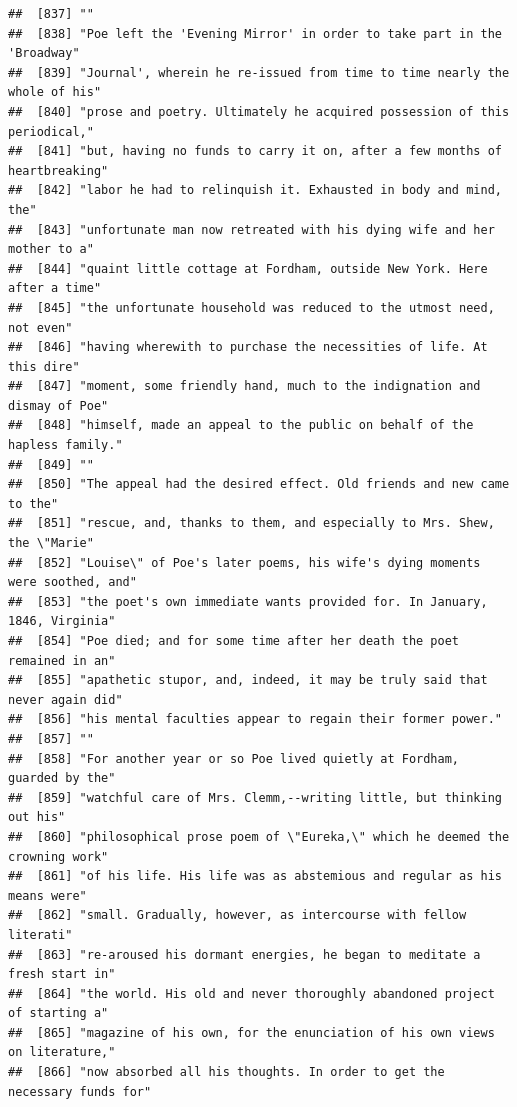 \documentclass{article}\usepackage[]{graphicx}\usepackage[]{color}
\makeatletter
\newenvironment{kframe}{%
 \def\at@end@of@kframe{}%
 \ifinner\ifhmode%
  \def\at@end@of@kframe{\end{minipage}}%
  \begin{minipage}{\columnwidth}%
 \fi\fi%
 \def\FrameCommand##1{\hskip\@totalleftmargin \hskip-\fboxsep
 \colorbox{shadecolor}{##1}\hskip-\fboxsep
     \hskip-\linewidth \hskip-\@totalleftmargin \hskip\columnwidth}%
 \MakeFramed {\advance\hsize-\width
   \@totalleftmargin\z@ \linewidth\hsize
   \@setminipage}}%
 {\par\unskip\endMakeFramed%
 \at@end@of@kframe}
\newenvironment{knitrout}{}{} %
\makeatother
\begin{document}
\begin{knitrout}
\begin{kframe}
\begin{verbatim}
##  [837] ""                                                                            
##  [838] "Poe left the 'Evening Mirror' in order to take part in the 'Broadway"        
##  [839] "Journal', wherein he re-issued from time to time nearly the whole of his"    
##  [840] "prose and poetry. Ultimately he acquired possession of this periodical,"     
##  [841] "but, having no funds to carry it on, after a few months of heartbreaking"    
##  [842] "labor he had to relinquish it. Exhausted in body and mind, the"              
##  [843] "unfortunate man now retreated with his dying wife and her mother to a"       
##  [844] "quaint little cottage at Fordham, outside New York. Here after a time"       
##  [845] "the unfortunate household was reduced to the utmost need, not even"          
##  [846] "having wherewith to purchase the necessities of life. At this dire"          
##  [847] "moment, some friendly hand, much to the indignation and dismay of Poe"       
##  [848] "himself, made an appeal to the public on behalf of the hapless family."      
##  [849] ""                                                                            
##  [850] "The appeal had the desired effect. Old friends and new came to the"          
##  [851] "rescue, and, thanks to them, and especially to Mrs. Shew, the \"Marie"       
##  [852] "Louise\" of Poe's later poems, his wife's dying moments were soothed, and"   
##  [853] "the poet's own immediate wants provided for. In January, 1846, Virginia"     
##  [854] "Poe died; and for some time after her death the poet remained in an"         
##  [855] "apathetic stupor, and, indeed, it may be truly said that never again did"    
##  [856] "his mental faculties appear to regain their former power."                   
##  [857] ""                                                                            
##  [858] "For another year or so Poe lived quietly at Fordham, guarded by the"         
##  [859] "watchful care of Mrs. Clemm,--writing little, but thinking out his"          
##  [860] "philosophical prose poem of \"Eureka,\" which he deemed the crowning work"   
##  [861] "of his life. His life was as abstemious and regular as his means were"       
##  [862] "small. Gradually, however, as intercourse with fellow literati"              
##  [863] "re-aroused his dormant energies, he began to meditate a fresh start in"      
##  [864] "the world. His old and never thoroughly abandoned project of starting a"     
##  [865] "magazine of his own, for the enunciation of his own views on literature,"    
##  [866] "now absorbed all his thoughts. In order to get the necessary funds for"      

\end{verbatim}
\end{kframe}
\end{knitrout}
\end{document}
